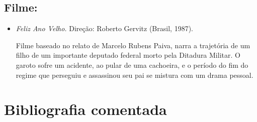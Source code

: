 \documentclass[12pt]{extarticle}
\begin{document}
\subsection{Filme:}

\begin{itemize}
\item\emph{Feliz Ano Velho.} Direção: Roberto Gervitz (Brasil, 1987). 

Filme baseado no relato de Marcelo Rubens Paiva, narra a trajetória de um filho de um importante deputado federal morto pela Ditadura Militar. O garoto sofre um acidente, ao pular de uma cachoeira, e o período do fim do regime que perseguiu e assassinou seu pai se mistura com um drama pessoal. 
\end{itemize}

\section{Bibliografia comentada}
\end{document}
